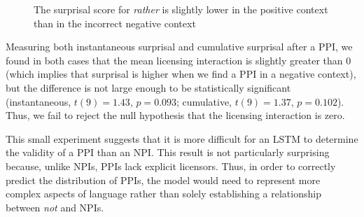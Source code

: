 \documentclass[11pt, round]{article}
\begin{document}
\begin{figure}
    \centering
    \qquad
     \caption{The surprisal score for \textit{rather} is slightly lower in the positive context than in the incorrect negative context}
    \label{fig:ppi-basic-licensing}
\end{figure}

Measuring both instantaneous surprisal and cumulative surprisal after a PPI, we found in both cases that the mean licensing interaction is slightly greater than 0 (which implies that surprisal is higher when we find a PPI in a negative context), but the difference is not large enough to be statistically significant (instantaneous, $t(9) = 1.43$, $p = 0.093$; cumulative, $t(9) = 1.37$, $p = 0.102$). Thus, we fail to reject the null hypothesis that the licensing interaction is zero.

This small experiment suggests that it is more difficult for an LSTM to determine the validity of a PPI than an NPI. This result is not particularly surprising because, unlike NPIs, PPIs lack explicit licensors. Thus, in order to correctly predict the distribution of PPIs, the model would need to represent more complex aspects of language rather than solely establishing a relationship between \textit{not} and NPIs.
\end{document}
